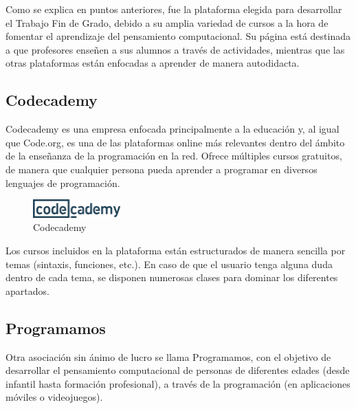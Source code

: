 Como se explica en puntos anteriores, fue la plataforma elegida para desarrollar el Trabajo Fin de Grado, debido a su amplia variedad de cursos a la hora de fomentar el aprendizaje del pensamiento computacional. Su página está destinada a que profesores
enseñen a sus alumnos a través de actividades, mientras que las otras plataformas están enfocadas a aprender de manera autodidacta.


\subsection{Codecademy}
\label{2:sec:3}

Codecademy es una empresa enfocada principalmente a la educación y, al igual que Code.org, es una de las plataformas online más relevantes dentro del ámbito de la enseñanza de la programación en la red. Ofrece múltiples cursos gratuitos, de manera que cualquier
persona pueda aprender a programar en diversos lenguajes de programación.

\begin{figure}[!th]
\begin{center}
\includegraphics[width=0.3\textwidth]{images/captura_codecademy.eps}
\caption{Codecademy}
\label{fig:2}
\end{center}
\end{figure}

Los cursos incluidos en la plataforma están estructurados de manera sencilla por temas (sintaxis, funciones, etc.). En caso de que el usuario tenga alguna duda dentro de cada tema, se disponen numerosas clases para dominar los diferentes apartados.


\subsection{Programamos}
\label{2:sec:4}

Otra asociación sin ánimo de lucro se llama Programamos, con el objetivo de desarrollar el pensamiento computacional de personas de diferentes edades (desde infantil hasta formación profesional), a través de la programación (en aplicaciones móviles o videojuegos).

